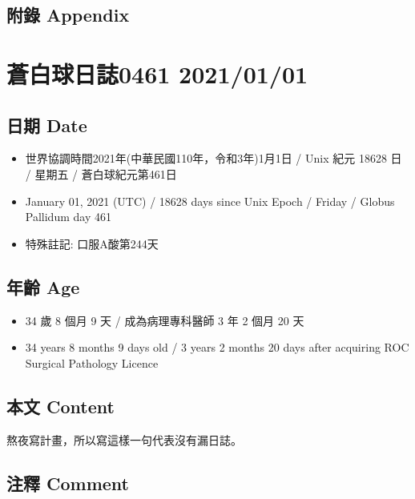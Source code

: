 \documentclass[a5paper, 11pt
]{book}
\providecommand{\tightlist}{%
  \setlength{\itemsep}{0pt}\setlength{\parskip}{0pt}}
\begin{document}
\hypertarget{ux9644ux9304-appendix-30}{%
\subsection{附錄 Appendix}\label{ux9644ux9304-appendix-30}}

\hypertarget{ux84bcux767dux7403ux65e5ux8a8c0461-20210101}{%
\section{蒼白球日誌0461
2021/01/01}\label{ux84bcux767dux7403ux65e5ux8a8c0461-20210101}}

\hypertarget{ux65e5ux671f-date-31}{%
\subsection{日期 Date}\label{ux65e5ux671f-date-31}}

\begin{itemize}
\tightlist
\item
  世界協調時間2021年(中華民國110年，令和3年)1月1日 / Unix 紀元 18628 日
  / 星期五 / 蒼白球紀元第461日
\item
  January 01, 2021 (UTC) / 18628 days since Unix Epoch / Friday / Globus
  Pallidum day 461
\item
  特殊註記: 口服A酸第244天
\end{itemize}

\hypertarget{ux5e74ux9f61-age-31}{%
\subsection{年齡 Age}\label{ux5e74ux9f61-age-31}}

\begin{itemize}
\tightlist
\item
  34 歲 8 個月 9 天 / 成為病理專科醫師 3 年 2 個月 20 天
\item
  34 years 8 months 9 days old / 3 years 2 months 20 days after
  acquiring ROC Surgical Pathology Licence
\end{itemize}

\hypertarget{ux672cux6587-content-31}{%
\subsection{本文 Content}\label{ux672cux6587-content-31}}

熬夜寫計畫，所以寫這樣一句代表沒有漏日誌。

\hypertarget{ux6ce8ux91cb-comment-31}{%
\subsection{注釋 Comment}\label{ux6ce8ux91cb-comment-31}}
\end{document}
